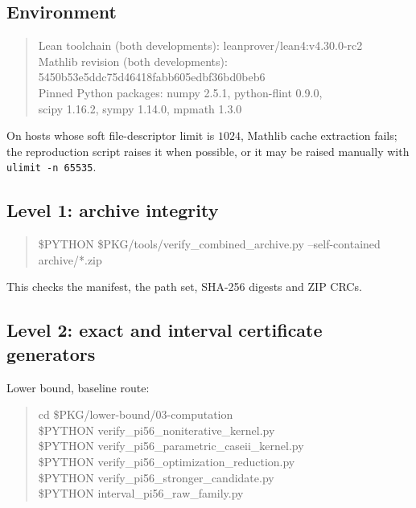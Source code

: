 \documentclass[11pt]{article}
\theoremstyle{plain}
\theoremstyle{definition}
\theoremstyle{remark}
\begin{document}
\subsection*{Environment}

\begin{quote}\small\ttfamily\raggedright
Lean toolchain (both developments): leanprover/lean4:v4.30.0-rc2\\
Mathlib revision (both developments):\\
\hspace*{1em}5450b53e5ddc75d46418fabb605edbf36bd0beb6\\
Pinned Python packages: numpy 2.5.1, python-flint 0.9.0,\\
\hspace*{1em}scipy 1.16.2, sympy 1.14.0, mpmath 1.3.0
\end{quote}

On hosts whose soft file-descriptor limit is $1024$, Mathlib cache extraction
fails; the reproduction script raises it when possible, or it may be raised
manually with \verb|ulimit -n 65535|.

\subsection*{Level 1: archive integrity}

\begin{quote}\small\ttfamily
\$PYTHON \$PKG/tools/verify\_combined\_archive.py --self-contained archive/*.zip
\end{quote}
This checks the manifest, the path set, SHA-256 digests and ZIP CRCs.

\subsection*{Level 2: exact and interval certificate generators}

Lower bound, baseline route:
\begin{quote}\small\ttfamily
cd \$PKG/lower-bound/03-computation\\
\$PYTHON verify\_pi56\_noniterative\_kernel.py\\
\$PYTHON verify\_pi56\_parametric\_caseii\_kernel.py\\
\$PYTHON verify\_pi56\_optimization\_reduction.py\\
\$PYTHON verify\_pi56\_stronger\_candidate.py\\
\$PYTHON interval\_pi56\_raw\_family.py
\end{quote}
\end{document}
